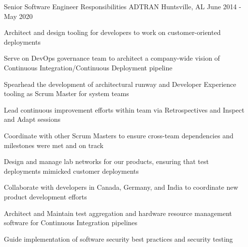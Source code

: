 
\begin{cventries}
  \cventry
    {Senior Software Engineer Responsibilities} %
    {ADTRAN} %
    {Huntsville, AL} %
    {June 2014 - May 2020} %
    {
      \begin{cvitems} %
        \item {Architect and design tooling for developers to work on customer-oriented deployments}
        \item {Serve on DevOps governance team to architect a company-wide vision of Continuous Integration/Continuous Deployment pipeline}
        \item {Spearhead the development of architectural runway and Developer Experience tooling as Scrum Master for system teams}
        \item {Lead continuous improvement efforts within team via Retrospectives and Inspect and Adapt sessions}
        \item {Coordinate with other Scrum Masters to ensure cross-team dependencies and milestones were met and on track}
        \item {Design and manage lab networks for our products, ensuring that test deployments mimicked customer deployments}
        \item {Collaborate with developers in Canada, Germany, and India to coordinate new product development efforts}
        \item {Architect and Maintain test aggregation and hardware resource management software for Continuous Integration pipelines}
        \item {Guide implementation of software security best practices and security testing}
      \end{cvitems}
    }

\end{cventries}
